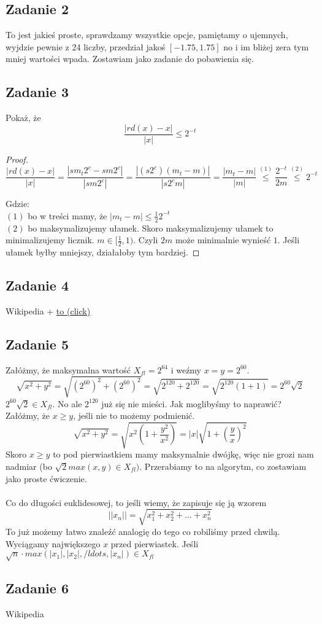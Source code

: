 \documentclass[a4paper]{article}
\begin{document}
\subsection*{Zadanie 2}
To jest jakieś proste, sprawdzamy wszystkie opcje, pamiętamy o ujemnych, wyjdzie pewnie z 24 liczby, przedział jakoś $[-1.75,1.75]$ no i im bliżej zera tym mniej wartości wpada. Zostawiam jako zadanie do pobawienia się.

\subsection*{Zadanie 3}
Pokaż, że 
$$\frac{|rd(x)-x|}{|x|}\leq 2^{-t}$$

\begin{proof}
$$\frac{|rd(x)-x|}{|x|} = \frac{|sm_t2^c-sm2^c|}{|sm2^c|} = \frac{|(s2^c)(m_t-m)|}{|s2^cm|} = \frac{|m_t-m|}{|m|} \overset{(1)}{\leq} \frac{2^{-t}}{2m} \overset{(2)}{\leq} 2^{-t}$$

Gdzie:\\
$(1)$ bo w treści mamy, że $|m_t-m|\leq \frac{1}{2} 2^{-t}$\\
$(2)$ bo maksymalizujemy ułamek. Skoro maksymalizujemy ułamek to minimalizujemy licznik. $m\in [\frac{1}{2},1)$. Czyli $2m$ może minimalnie wynieść $1$. Jeśli ułamek byłby mniejszy, działałoby tym bardziej.  
\end{proof}

\subsection*{Zadanie 4}
Wikipedia + \href{http://lucc.pl/inf/architektura_komputerow_2/egzamin/materia%B3y/zmiennoprzecinkowe.pdf}{to (click)}

\subsection*{Zadanie 5}
Załóżmy, że maksymalna wartość $X_{fl}=2^{64}$ i weźmy $x=y=2^{60}$. 
$$\sqrt{x^2+y^2}=\sqrt{(2^{60})^2+(2^{60})^2}=\sqrt{2^{120}+2^{120}}=\sqrt{2^{120}(1+1)}=2^{60}\sqrt{2}$$
$2^{60}\sqrt{2} \in X_{fl}$. No ale $2^{120}$ już się nie mieści. Jak moglibyśmy to naprawić?\\
Załóżmy, że $x\geq y$, jeśli nie to możemy podmienić. 
$$\sqrt{x^2+y^2}=\sqrt{x^2(1+\frac{y^2}{x^2})}=|x|\sqrt{1+(\frac{y}{x})^2} $$ 
Skoro $x\geq y$ to pod pierwiastkiem mamy maksymalnie dwójkę, więc nie grozi nam nadmiar (bo $\sqrt{2}max(x,y) \in X_{fl})$. Przerabiamy to na algorytm, co zostawiam jako proste ćwiczenie.\\ \\
Co do długości euklidesowej, to jeśli wiemy, że zapisuje się ją wzorem $$||x_n|| = \sqrt{x_1^2+x_2^2+\ldots + x_n^2}$$
To już możemy łatwo znaleźć analogię do tego co robiliśmy przed chwilą. Wyciągamy największego $x$ przed pierwiastek. Jeśli $\sqrt{n}\cdot max(|x_1|,|x_2|,/ldots,|x_n|) \in X_{fl}$

\subsection*{Zadanie 6}
Wikipedia
\end{document}
